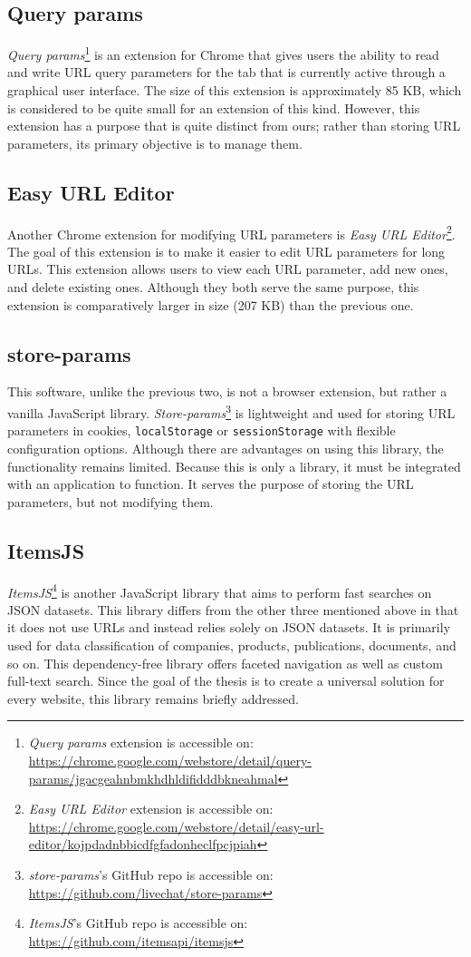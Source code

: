 \subsection*{Query params}
\emph{Query params}\footnote{\emph{Query params} extension is accessible on: \url{https://chrome.google.com/webstore/detail/query-params/jgacgeahnbmkhdhldifidddbkneahmal}} is an extension for Chrome that gives users the ability to read and write URL query parameters for the tab that is currently active through a graphical user interface. The size of this extension is approximately 85 KB, which is considered to be quite small for an extension of this kind. However, this extension has a purpose that is quite distinct from ours; rather than storing URL parameters, its primary objective is to manage them.

\subsection*{Easy URL Editor}
Another Chrome extension for modifying URL parameters is \emph{Easy URL Editor}\footnote{\emph{Easy URL Editor} extension is accessible on: \url{https://chrome.google.com/webstore/detail/easy-url-editor/kojpdadnbbicdfgfadonheclfpcjpiah}}. The goal of this extension is to make it easier to edit URL parameters for long URLs. This extension allows users to view each URL parameter, add new ones, and delete existing ones. Although they both serve the same purpose, this extension is comparatively larger in size (207 KB) than the previous one.

\subsection*{store-params}
This software, unlike the previous two, is not a browser extension, but rather a vanilla JavaScript library. \emph{Store-params}\footnote{\emph{store-params}'s GitHub repo is accessible on: \url{https://github.com/livechat/store-params}} is lightweight and used for storing URL parameters in cookies, \texttt{localStorage} or \texttt{sessionStorage} with flexible configuration options. Although there are advantages on using this library, the functionality remains limited. Because this is only a library, it must be integrated with an application to function. It serves the purpose of storing the URL parameters, but not modifying them.

\subsection*{ItemsJS}
\emph{ItemsJS}\footnote{\emph{ItemsJS}'s GitHub repo is accessible on: \url{https://github.com/itemsapi/itemsjs}} is another JavaScript library that aims to perform fast searches on JSON datasets. This library differs from the other three mentioned above in that it does not use URLs and instead relies solely on JSON datasets. It is primarily used for data classification of companies, products, publications, documents, and so on. This dependency-free library offers faceted navigation as well as custom full-text search. Since the goal of the thesis is to create a universal solution for every website, this library remains briefly addressed.

